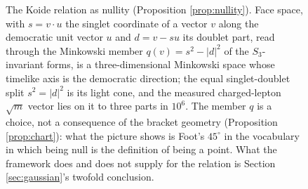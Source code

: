 \documentclass[11pt]{article}
\theoremstyle{definition}
\begin{document}
\begin{figure}[ht]
\centering
{}
\caption{The Koide relation as nullity (Proposition \ref{prop:nullity}). Face space, with $s = v \cdot u$ the singlet coordinate of a vector $v$ along the democratic unit vector $u$ and $d = v - su$ its doublet part, read through the Minkowski member $q(v) = s^{2} - |d|^{2}$ of the $S_{3}$-invariant forms, is a three-dimensional Minkowski space whose timelike axis is the democratic direction; the equal singlet-doublet split $s^{2} = |d|^{2}$ is its light cone, and the measured charged-lepton $\sqrt{m}$ vector lies on it to three parts in $10^{6}$. The member $q$ is a choice, not a consequence of the bracket geometry (Proposition \ref{prop:chart}): what the picture shows is Foot's $45^{\circ}$ in the vocabulary in which being null is the definition of being a point. What the framework does and does not supply for the relation is Section \ref{sec:gaussian}'s twofold conclusion.}
\label{fig:lightcone}
\end{figure}
\end{document}
